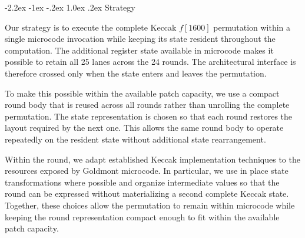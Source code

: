 \documentclass[journal=tches,submission]{iacrtrans}
\makeatletter
\newcommand{\yvali}[1]{\todo[inline,color=darkviolet]{\textcolor{white}{\textbf{Yuval:} #1}}}
\newcommand{\yval}[1]{\todo[color=darkviolet,size=\footnotesize]{\textcolor{white}{\textbf{Yuval:} #1}}}
\renewcommand\subsection{\@startsection{subsection}{2}{\z@}%
      {-2.2ex \@plus -1ex \@minus -.2ex}%
      {1.0ex \@plus .2ex}%
      {\normalfont\large\bfseries\SS@subsectfont}}
\makeatother
\begin{document}


\subsection{Strategy}
\label{sec}

Our strategy is to execute the complete Keccak \(f[1600]\) permutation within a single microcode invocation while keeping its state resident throughout the computation. 
The additional register state available in microcode makes it possible to retain all 25 lanes across the 24 rounds. 
The architectural interface is therefore crossed only when the state enters and leaves the permutation.

To make this possible within the available patch capacity, we use a compact round body that is reused across all rounds rather than unrolling the complete permutation. 
The state representation is chosen so that each round restores the layout required by the next one. 
This allows the same round body to operate repeatedly on the resident state without additional state rearrangement.

Within the round, we adapt established Keccak implementation techniques to the resources exposed by Goldmont microcode. 
In particular, we use in place state transformations where possible and organize intermediate values so that the round can be expressed without materializing a second complete Keccak state.
Together, these choices allow the permutation to remain within microcode while keeping the round representation compact enough to fit within the available patch capacity.
\end{document}
